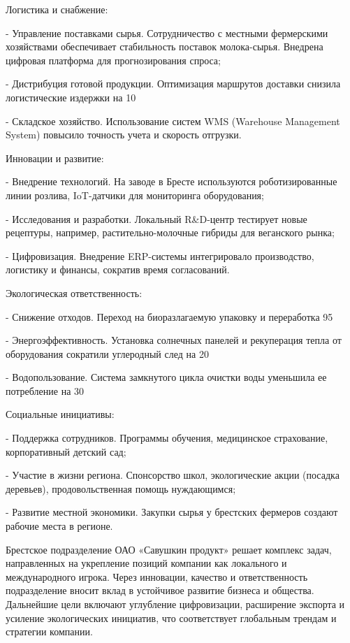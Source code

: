 {  \par \redline Логистика и снабжение:
  \par \redline - Управление поставками сырья. Сотрудничество с местными фермерскими хозяйствами обеспечивает стабильность поставок молока-сырья. Внедрена цифровая платформа для прогнозирования спроса;
  \par \redline - Дистрибуция готовой продукции. Оптимизация маршрутов доставки снизила логистические издержки на 10%
  \par \redline - Складское хозяйство. Использование систем WMS (Warehouse Management System) повысило точность учета и скорость отгрузки.

  \par \redline Инновации и развитие:
  \par \redline - Внедрение технологий. На заводе в Бресте используются роботизированные линии розлива, IoT-датчики для мониторинга оборудования;
  \par \redline - Исследования и разработки. Локальный R&D-центр тестирует новые рецептуры, например, растительно-молочные гибриды для веганского рынка;
  \par \redline - Цифровизация. Внедрение ERP-системы интегрировало производство, логистику и финансы, сократив время согласований.

  \par \redline Экологическая ответственность:
  \par \redline - Снижение отходов. Переход на биоразлагаемую упаковку и переработка 95%
  \par \redline - Энергоэффективность. Установка солнечных панелей и рекуперация тепла от оборудования сократили углеродный след на 20%
  \par \redline - Водопользование. Система замкнутого цикла очистки воды уменьшила ее потребление на 30%

  \par \redline Социальные инициативы:
  \par \redline - Поддержка сотрудников. Программы обучения, медицинское страхование, корпоративный детский сад;
  \par \redline - Участие в жизни региона. Спонсорство школ, экологические акции (посадка деревьев), продовольственная помощь нуждающимся;
  \par \redline - Развитие местной экономики. Закупки сырья у брестских фермеров создают рабочие места в регионе.

  \par \redline Брестское подразделение ОАО «Савушкин продукт» решает комплекс задач, направленных на укрепление позиций компании как локального и международного игрока. Через инновации, качество и ответственность подразделение вносит вклад в устойчивое развитие бизнеса и общества. Дальнейшие цели включают углубление цифровизации, расширение экспорта и усиление экологических инициатив, что соответствует глобальным трендам и стратегии компании.

  \par
}

